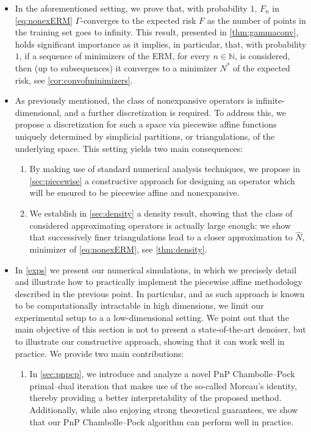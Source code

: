 \documentclass[onefignum,onetabnum]{siamonline250211}
\begin{document}
\begin{itemize}
\item In the aforementioned setting, we prove that, with probability $1$, $F_n$ in \cref{eq:nonexERM} $\Gamma$-converges to the expected risk $F$ as the number of points in the training set goes to infinity. This result, presented in \cref{thm:gammaconv}, holds significant importance as it implies, in particular, that, with probability $1$, if a sequence of minimizers of the ERM, for every $n\in\mathbb{N}$, is considered, then (up to subsequences) it converges to a minimizer $N^*$ of the expected risk, see \cref{cor:convofminimizers}.

\item As previously mentioned, the class of nonexpansive operators is infinite-dimensional, and a further discretization is required. To address this, we propose a discretization for such a space via piecewise affine functions uniquely determined by simplicial partitions, or triangulations, of the underlying space. This setting yields two main consequences:
\begin{enumerate}[label=(\roman*),leftmargin=*]
\item By making use of standard numerical analysis techniques, we propose in \cref{sec:piecewise} a constructive approach for designing an operator which will be ensured to be piecewise affine and nonexpansive.
\item We establish in \cref{sec:density} a density result, showing that the class of considered approximating operators is actually large enough: we show that successively finer triangulations lead to a closer approximation to $\widehat N$, minimizer of \cref{eq:nonexERM}, see \cref{thm:density}.
\end{enumerate}
\item In \cref{exps} we present our numerical simulations, in which we precisely detail and illustrate how to practically implement the piecewise affine methodology described in the previous point. In particular, and as such approach is known to be computationally intractable in high dimensions, we limit our experimental setup to a a low-dimensional setting. We point out that the main objective of this section is not to present a state-of-the-art denoiser, but to illustrate our constructive approach, showing that it can work well in practice. We provide two main contributions: 
\begin{enumerate}[label=(\roman*),leftmargin=*]
\item In \cref{sec:pnpcp}, we introduce and analyze a novel PnP Chambolle--Pock primal–dual iteration that makes use of the so-called Moreau's identity, thereby providing a better interpretability of the proposed method. Additionally, while also enjoying strong theoretical guarantees, we show that our PnP Chambolle--Pock algorithm can perform well in practice.

\end{enumerate}
\end{itemize}
\end{document}
